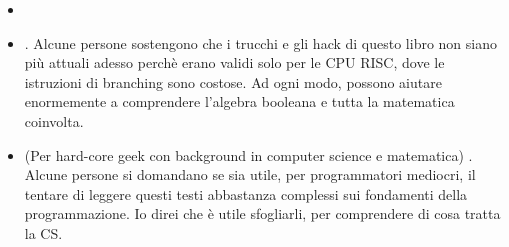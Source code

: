 \begin{itemize}

\item \RobPikePractice

\item \HenryWarren.
Alcune persone sostengono che i trucchi e gli hack di questo libro non siano più attuali adesso perchè erano validi solo per le \ac{CPU} \ac{RISC},
dove le istruzioni di branching sono costose.
Ad ogni modo, possono aiutare enormemente a comprendere l'algebra booleana e tutta la matematica coinvolta.

\item (Per hard-core geek con background in computer science e matematica) \TAOCP.
Alcune persone si domandano se sia utile, per programmatori mediocri, il tentare di leggere questi testi abbastanza complessi sui fondamenti della programmazione.
Io direi che è utile sfogliarli, per comprendere di cosa tratta la \ac{CS}.

\end{itemize}



\iffalse
\subsection{Dedica}

Come scritto nella prima pagina di questo libro, ``Questo libro è dedicato a Robert Jourdain, John Socha, Ralf Brown e Peter Abel''.
Si tratta di autori famosi di libri sul linguaggio assembly e di riferimento negli anni 1980 e 1990:

\begin{itemize}
\item Robert Jourdain -- Programmer's problem solver for the IBM PC, XT, \& AT (1986)

\item Peter Norton e John Socha -- The Peter Norton Programmer's Guide to the IBM PC (1985), Peter Norton's Assembly Language Book for the IBM PC (1989).
Di fatto, John Socha è un vero autore di questi libri, si può dire, era un ghostwriter.
Inoltre è autore del Norton Commander.

\item Ralph Brown era conosciuto per la ``Ralf Brown's Interrupt List''\footnote{\url{http://www.ctyme.com/rbrown.htm}}.

\item Peter Abel -- IBM PC assembly language and programming (1991)
\end{itemize}

Chiaramente si tratta di libri antiquati.
Ma magari qualcuno si ricorderà di ``quei tempi''.
\fi
